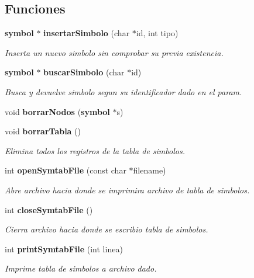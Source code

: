 \subsection*{Funciones}
\begin{CompactItemize}
\item 
{\bf symbol} $\ast$ {\bf insertar\-Simbolo} (char $\ast$id, int tipo)
\begin{CompactList}\small\item\em Inserta un nuevo simbolo sin comprobar su previa existencia. \item\end{CompactList}\item 
{\bf symbol} $\ast$ {\bf buscar\-Simbolo} (char $\ast$id)
\begin{CompactList}\small\item\em Busca y devuelve simbolo segun su identificador dado en el param. \item\end{CompactList}\item 
void {\bf borrar\-Nodos} ({\bf symbol} $\ast$s)
\item 
void {\bf borrar\-Tabla} ()
\begin{CompactList}\small\item\em Elimina todos los registros de la tabla de simbolos. \item\end{CompactList}\item 
int {\bf open\-Symtab\-File} (const char $\ast$filename)
\begin{CompactList}\small\item\em Abre archivo hacia donde se imprimira archivo de tabla de simbolos. \item\end{CompactList}\item 
int {\bf close\-Symtab\-File} ()
\begin{CompactList}\small\item\em Cierra archivo hacia donde se escribio tabla de simbolos. \item\end{CompactList}\item 
int {\bf print\-Symtab\-File} (int linea)
\begin{CompactList}\small\item\em Imprime tabla de simbolos a archivo dado. \item\end{CompactList}\end{CompactItemize}
